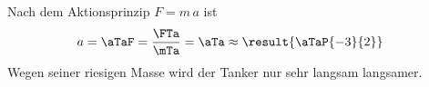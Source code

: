 Nach dem Aktionsprinzip $F = m\,a$ ist
\begin{align}
 a &= \aTaF = \frac{\FTa}{\mTa} = \aTa \approx \result{\aTaP{-3}{2}}
\end{align}
Wegen seiner riesigen Masse wird der Tanker nur sehr langsam langsamer.
